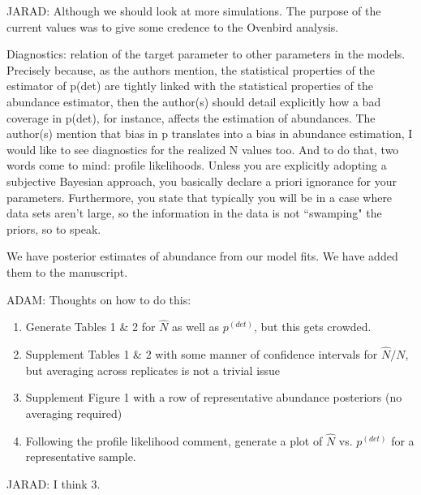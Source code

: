 \documentclass[12pt]{article}
\renewenvironment{quote}  %
              {\list{}{\rightmargin\leftmargin}\normalfont%
               \item\relax}
              {\endlist}
\newcommand{\adam}[1]{{\color{blue} ADAM: #1}}
\newcommand{\jarad}[1]{{\color{Orange} JARAD: #1}}
\newcommand{\pdet}{p^{(det)}}
\begin{document}
\jarad{Although we should look at more simulations. The purpose of the current values
was to give some credence to the Ovenbird analysis.}

Diagnostics: relation of the target parameter to other parameters in the models. Precisely because, as the authors mention, the statistical properties of the estimator of p(det) are tightly linked with the statistical properties of the abundance estimator, then the author(s) should detail explicitly how a bad coverage in p(det), for instance, affects the estimation of abundances. The author(s) mention that bias in p translates into a bias in abundance estimation, I would like to see diagnostics for the realized N values too. And to do that, two words come to mind: profile likelihoods. Unless you are explicitly adopting a subjective Bayesian approach, you basically declare a priori ignorance for your parameters.  Furthermore, you state that typically you will be in a case where data sets aren't large, so the information in the data is not ``swamping" the priors, so to speak.
\begin{quote}
We have posterior estimates of abundance from our model fits.  We have added them to the manuscript.\\
\adam{Thoughts on how to do this:
\begin{enumerate}
\item Generate Tables 1 \& 2 for $\hat{N}$ as well as $\pdet$, but this gets crowded.
\item Supplement Tables 1 \& 2 with some manner of confidence intervals for $\hat{N} / N$, but averaging across replicates is not a trivial issue
\item Supplement Figure 1 with a row of representative abundance posteriors (no averaging required)
\item Following the profile likelihood comment, generate a plot of $\hat{N}$ vs. $\pdet$ for a representative sample.
\end{enumerate}
}
\jarad{I think 3.}
\end{quote}
\end{document}
